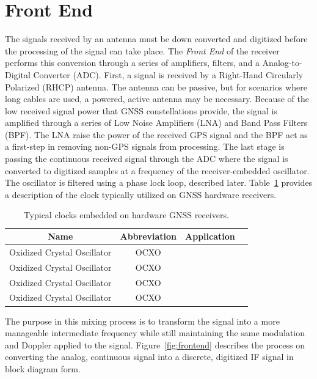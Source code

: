 \section{Front End}
The signals received by an antenna must be down converted and digitized before the processing of the signal can take place. The \textit{Front End} of the receiver performs this conversion through a series of amplifiers, filters, and a Analog-to-Digital Converter (ADC). First, a signal is received by a Right-Hand Circularly Polarized (RHCP) antenna. The antenna can be passive, but for scenarios where long cables are used, a powered, active antenna may be necessary. Because of the low received signal power that GNSS constellations provide, the signal is amplified through a series of Low Noise Amplifiers (LNA) and Band Pass Filters (BPF). The LNA raise the power of the received GPS signal and the BPF act as a first-step in removing non-GPS signals from processing. The last stage is passing the continuous received signal through the ADC where the signal is converted to digitized samples at a frequency of the receiver-embedded oscillator. The oscillator is filtered using a phase lock loop, described later. Table~\ref{tbl:clocks} provides a description of the clock typically utilized on GNSS hardware receivers.

\begin{table}[!ht]\label{tbl:clocks}
    \caption{Typical clocks embedded on hardware GNSS receivers.}
    \centering
    \begin{tabular}{cccc}
        \toprule
        Name                        & Abbreviation & Application \\
        \midrule
        Oxidized Crystal Oscillator & OCXO         &             \\
        Oxidized Crystal Oscillator & OCXO         &             \\
        Oxidized Crystal Oscillator & OCXO         &             \\
        Oxidized Crystal Oscillator & OCXO         &             \\
        \bottomrule
    \end{tabular}
\end{table}

The purpose in this mixing process is to transform the signal into a more manageable intermediate frequency while still maintaining the same modulation and Doppler applied to the signal. Figure~\ref{fig:frontend} describes the process on converting the analog, continuous signal into a discrete, digitized IF signal in block diagram form.

